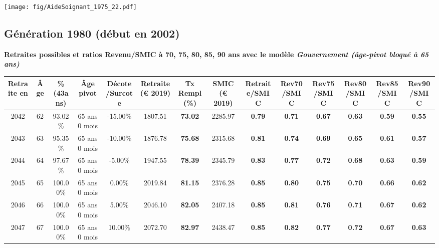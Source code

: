  \vspace{0.1cm} 

 \begin{center}\texttt{[image: fig/AideSoignant\_1975\_22.pdf]}\end{center} \label{fig/AideSoignant_1975_22.pdf} 

\newpage 
 
\subsection{Génération 1980 (début en 2002)} 

{\bf \noindent Retraites possibles et ratios Revenu/SMIC à 70, 75, 80, 85, 90 ans avec le modèle \emph{Gouvernement (âge-pivot bloqué à 65 ans)}}  
 
\begin{adjustbox}{max width=\textwidth} 
\begin{tabular}[htb]{|c|c||c|c|c||c|c||c||c|c|c|c|c|c|} 
\hline 
 Retraite en &  Âge &  \%(43ans) &  Âge pivot &  Décote/Surcote &  Retraite (\euro{} 2019) &  Tx Rempl(\%) &  SMIC (\euro{} 2019) &  Retraite/SMIC &  Rev70/SMIC &  Rev75/SMIC &  Rev80/SMIC &  Rev85/SMIC &  Rev90/SMIC \\ 
\hline \hline 
 2042 &  62 &  93.02\% &  65 ans 0 mois &  -15.00\% &  1807.51 &  {\bf 73.02} &  2285.97 &  {\bf {\color{red} 0.79}} &  {\bf {\color{red} 0.71}} &  {\bf {\color{red} 0.67}} &  {\bf {\color{red} 0.63}} &  {\bf {\color{red} 0.59}} &  {\bf {\color{red} 0.55}} \\ 
\hline 
 2043 &  63 &  95.35\% &  65 ans 0 mois &  -10.00\% &  1876.78 &  {\bf 75.68} &  2315.68 &  {\bf {\color{red} 0.81}} &  {\bf {\color{red} 0.74}} &  {\bf {\color{red} 0.69}} &  {\bf {\color{red} 0.65}} &  {\bf {\color{red} 0.61}} &  {\bf {\color{red} 0.57}} \\ 
\hline 
 2044 &  64 &  97.67\% &  65 ans 0 mois &  -5.00\% &  1947.55 &  {\bf 78.39} &  2345.79 &  {\bf {\color{red} 0.83}} &  {\bf {\color{red} 0.77}} &  {\bf {\color{red} 0.72}} &  {\bf {\color{red} 0.68}} &  {\bf {\color{red} 0.63}} &  {\bf {\color{red} 0.59}} \\ 
\hline 
 2045 &  65 &  100.00\% &  65 ans 0 mois &  0.00\% &  2019.84 &  {\bf 81.15} &  2376.28 &  {\bf {\color{red} 0.85}} &  {\bf {\color{red} 0.80}} &  {\bf {\color{red} 0.75}} &  {\bf {\color{red} 0.70}} &  {\bf {\color{red} 0.66}} &  {\bf {\color{red} 0.62}} \\ 
\hline 
 2046 &  66 &  100.00\% &  65 ans 0 mois &  5.00\% &  2046.10 &  {\bf 82.05} &  2407.18 &  {\bf {\color{red} 0.85}} &  {\bf {\color{red} 0.81}} &  {\bf {\color{red} 0.76}} &  {\bf {\color{red} 0.71}} &  {\bf {\color{red} 0.67}} &  {\bf {\color{red} 0.62}} \\ 
\hline 
 2047 &  67 &  100.00\% &  65 ans 0 mois &  10.00\% &  2072.70 &  {\bf 82.97} &  2438.47 &  {\bf {\color{red} 0.85}} &  {\bf {\color{red} 0.82}} &  {\bf {\color{red} 0.77}} &  {\bf {\color{red} 0.72}} &  {\bf {\color{red} 0.67}} &  {\bf {\color{red} 0.63}} \\ 
\hline 
\hline 
\end{tabular} 
\end{adjustbox} 
 

